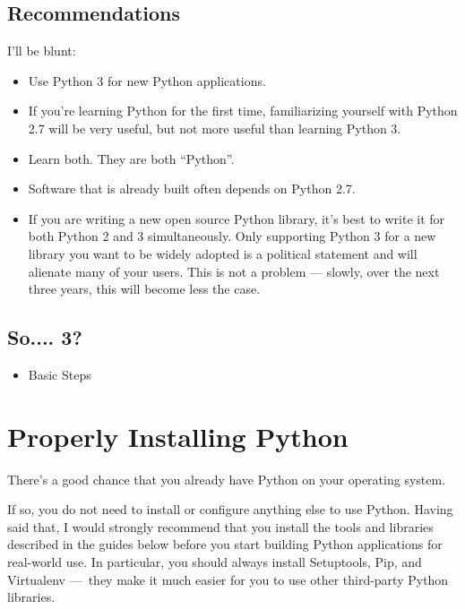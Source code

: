 \documentclass[letterpaper,10pt,english]{sphinxmanual}
\begin{document}
\subsection{Recommendations}
\label{\detokenize{starting/intro:recommendations}}
I'll be blunt:
\begin{itemize}
\item {} 
Use Python 3 for new Python applications.

\item {} 
If you're learning Python for the first time, familiarizing yourself with Python 2.7 will be very
useful, but not more useful than learning Python 3.

\item {} 
Learn both. They are both ``Python''.

\item {} 
Software that is already built often depends on Python 2.7.

\item {} 
If you are writing a new open source Python library, it's best to write it for both Python 2 and 3
simultaneously. Only supporting Python 3 for a new library you want to be widely adopted is a
political statement and will alienate many of your users. This is not a problem — slowly, over the next three years, this will become less the case.

\end{itemize}


\subsection{So.... 3?}
\label{\detokenize{starting/intro:so-3}}\begin{itemize}
\item {} 
Basic Steps

\end{itemize}


\section{Properly Installing Python}
\label{\detokenize{starting/instalation::doc}}\label{\detokenize{starting/instalation:properly-installing-python}}
There's a good chance that you already have Python on your operating system.

If so, you do not need to install or configure anything else to use Python.
Having said that, I would strongly recommend that you install the tools and
libraries described in the guides below before you start building Python
applications for real-world use. In particular, you should always install
Setuptools, Pip, and Virtualenv — they make it much easier for you to use
other third-party Python libraries.
\end{document}
